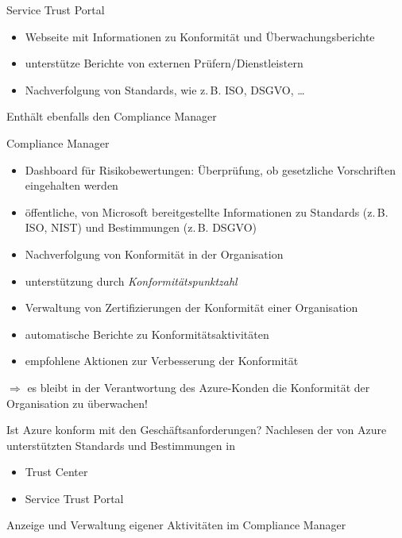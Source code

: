\begin{flashcard}[Definition]{Service Trust Portal}
    \begin{itemize}
        \item Webseite mit Informationen zu Konformität und Überwachungsberichte
        \item unterstütze Berichte von externen Prüfern/Dienstleistern
        \item Nachverfolgung von Standards, wie z.\,B. ISO, DSGVO, \ldots
    \end{itemize}
    
    \vspace{5mm}
    Enthält ebenfalls den Compliance Manager
\end{flashcard}

\begin{flashcard}[Describe]{Compliance Manager}
    \begin{itemize}
        \item Dashboard für Risikobewertungen:\newline
        Überprüfung, ob gesetzliche Vorschriften eingehalten werden
        \item öffentliche, von Microsoft bereitgestellte Informationen zu Standards (z.\,B. ISO, NIST) und Bestimmungen (z.\,B. DSGVO)
        \item Nachverfolgung von Konformität in der Organisation
        \item unterstützung durch \emph{Konformitätspunktzahl}
        \item Verwaltung von Zertifizierungen der Konformität einer Organisation
        \item automatische Berichte zu Konformitätsaktivitäten
        \item empfohlene Aktionen zur Verbesserung der Konformität
    \end{itemize}
    
    $\Rightarrow$ es bleibt in der Verantwortung des Azure-Konden die Konformität der Organisation zu überwachen!
\end{flashcard}

\begin{flashcard}[]{Ist Azure konform mit den Geschäftsanforderungen?}
    Nachlesen der von Azure unterstützten Standards und Bestimmungen in
    \begin{itemize}
        \item Trust Center
        \item Service Trust Portal
    \end{itemize}
    
    \vspace{5mm}
    Anzeige und Verwaltung eigener Aktivitäten im Compliance Manager
\end{flashcard}

